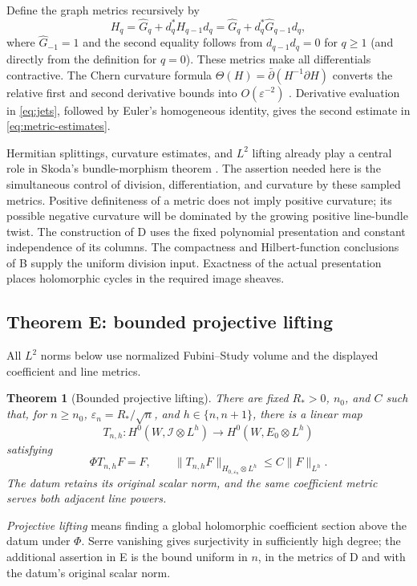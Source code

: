 \documentclass[11pt,reqno]{amsart}
\newtheorem{theorem}{Theorem}
\theoremstyle{remark}
\newcommand{\cI}{\mathscr I}
\newcommand{\eps}{\varepsilon}
\newcommand{\dbar}{\bar\partial}
\begin{document}
Define the graph metrics recursively by
\[
H_q=\widehat G_q+d_q^*H_{q-1}d_q
     =\widehat G_q+d_q^*\widehat G_{q-1}d_q,
\]
where $\widehat G_{-1}=1$ and the second equality follows from
$d_{q-1}d_q=0$ for $q\ge1$ (and directly from the definition for
$q=0$). These metrics make all differentials contractive.
The Chern curvature formula
$\Theta(H)=\dbar(H^{-1}\partial H)$ converts the relative first
and second derivative bounds into $O(\eps^{-2})$
\cite[Section~3]{Demailly}. Derivative evaluation in
\eqref{eq:jets}, followed by  Euler's homogeneous identity, gives the second estimate in \eqref{eq:metric-estimates}.

Hermitian splittings, curvature estimates, and $L^2$ lifting already
play a central role in Skoda's bundle-morphism theorem
\cite{Skoda1978}. The assertion needed here is the simultaneous
control of division, differentiation, and curvature by these sampled
metrics. Positive definiteness of a metric does not imply positive
curvature; its possible negative curvature will be dominated by
the growing positive line-bundle twist. The construction of D uses
the fixed polynomial presentation and constant independence of its
columns. The compactness and Hilbert-function conclusions of B
supply the uniform division input. Exactness of the actual
presentation places holomorphic cycles in the required image sheaves.

\subsection{Theorem E: bounded projective lifting}
All $L^2$ norms below use normalized Fubini--Study volume and the displayed
coefficient and line metrics.

\begin{theorem}[Bounded projective lifting]\label{thm:lift}
There are fixed $R_*>0$, $n_0$, and $C$ such that, for
$n\ge n_0$, $\eps_n=R_*/\sqrt n$, and $h\in\{n,n+1\}$, there is
a linear map
\[
 T_{n,h}:H^0(W,\cI\otimes L^h)
      \longrightarrow H^0(W,E_0\otimes L^h)
\]
satisfying
\begin{equation}\label{eq:lift}
 \Phi T_{n,h}F=F,\qquad
 \|T_{n,h}F\|_{H_{0,\eps_n}\otimes L^h}
       \le C\|F\|_{L^h}.
\end{equation}
The datum retains its original scalar norm, and the same coefficient
metric serves both adjacent line powers.
\end{theorem}

\emph{Projective lifting} means finding a global holomorphic
coefficient section above the datum under $\Phi$.
Serre vanishing gives surjectivity in sufficiently high degree;
the additional assertion in E is the bound uniform in $n$, in the
metrics of D and with the datum's original scalar norm.
\end{document}
